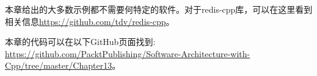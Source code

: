 本章给出的大多数示例都不需要何特定的软件。对于redis-cpp库，可以在这里看到相关信息\url{https://github.com/tdv/redis-cpp}。

本章的代码可以在以下GitHub页面找到: \url{https://github.com/PacktPublishing/Software-Architecture-with-Cpp/tree/master/Chapter13}。